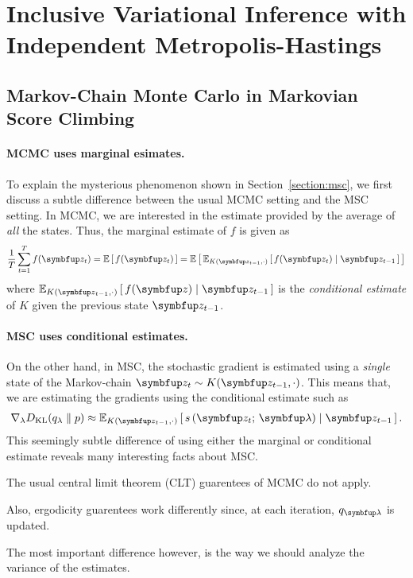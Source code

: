 
\section{Inclusive Variational Inference with Independent Metropolis-Hastings}

\subsection{Markov-Chain Monte Carlo in Markovian Score Climbing}\label{section:msc_mcmc}
\paragraph{MCMC uses marginal esimates.}
To explain the mysterious phenomenon shown in Section~\ref{section:msc}, we first discuss a subtle difference between the usual MCMC setting and the MSC setting.
In MCMC, we are interested in the estimate provided by the average of \textit{all} the states.
Thus, the marginal estimate of \(f\) is given as
\begin{align}
  \frac{1}{T} \sum^{T}_{t=1} f(\vz_t) = \E{f(\vz_t)} = \E{\Esub{K(\vz_{t-1},\cdot)}{ f(\vz_t) \mid \vz_{t-1}}}
\end{align}
where \(\Esub{K(\vz_{t-1},\cdot)}{ f(\vz) \mid \vz_{t-1}}\) is the \textit{conditional estimate} of \(K\) given the previous state \(\vz_{t-1}\).

\paragraph{MSC uses conditional estimates.}
On the other hand, in MSC, the stochastic gradient is estimated using a \textit{single} state of the Markov-chain \(\vz_t \sim K(\vz_{t-1}, \cdot)\).
This means that, we are estimating the gradients using the conditional estimate such as
\begin{align}
  \nabla_{\lambda} \DKL{q_{\lambda}}{p} \approx \Esub{K(\vz_{t-1},\cdot)}{s\,(\vz_t;\, \vlambda) \mid \vz_{t-1}}.
\end{align}
This seemingly subtle difference of using either the marginal or conditional estimate reveals many interesting facts about MSC.
\begin{enumerate*}[label=(\roman*)]
\item The usual central limit theorem (CLT) guarentees of MCMC do not apply.
\item Also, ergodicity guarentees work differently since, at each iteration, \(q_{\vlambda}\) is updated.
\end{enumerate*}
The most important difference however, is the way we should analyze the variance of the estimates.

